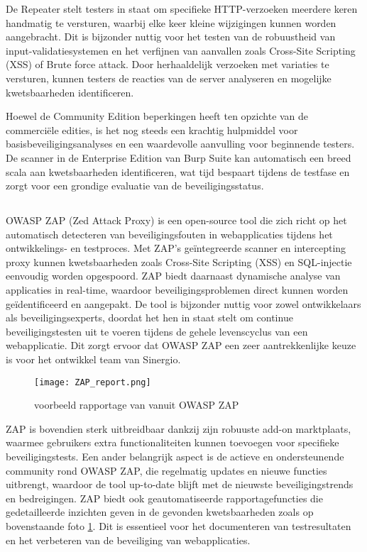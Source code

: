 De Repeater stelt testers in staat om specifieke HTTP-verzoeken meerdere keren handmatig te versturen, waarbij elke keer 
kleine wijzigingen kunnen worden aangebracht. Dit is bijzonder nuttig voor het testen van de robuustheid van 
input-validatiesystemen en het verfijnen van aanvallen zoals Cross-Site Scripting (XSS) of Brute force attack. Door 
herhaaldelijk verzoeken met variaties te versturen, kunnen testers de reacties van de server analyseren en mogelijke 
kwetsbaarheden identificeren.

Hoewel de Community Edition beperkingen heeft ten opzichte van de 
commerciële edities, is het nog steeds een krachtig hulpmiddel voor basisbeveiligingsanalyses en een waardevolle aanvulling 
voor beginnende testers. De scanner in de Enterprise Edition van Burp Suite kan automatisch een breed scala aan kwetsbaarheden 
identificeren, wat tijd bespaart tijdens de testfase en zorgt voor een grondige evaluatie van de beveiligingsstatus.

\subsection{}
OWASP ZAP (Zed Attack Proxy) is een open-source tool die zich richt op het automatisch detecteren van beveiligingsfouten in 
webapplicaties tijdens het ontwikkelings- en testproces. Met ZAP's geïntegreerde scanner en intercepting proxy kunnen 
kwetsbaarheden zoals Cross-Site Scripting (XSS) en SQL-injectie eenvoudig worden opgespoord. ZAP biedt 
daarnaast dynamische analyse van applicaties in real-time, waardoor beveiligingsproblemen direct kunnen worden geïdentificeerd 
en aangepakt. De tool is bijzonder nuttig voor zowel ontwikkelaars als beveiligingsexperts, doordat het hen in staat stelt 
om continue beveiligingstesten uit te voeren tijdens de gehele levenscyclus van een webapplicatie. Dit zorgt ervoor dat 
OWASP ZAP een zeer aantrekkenlijke keuze is voor het ontwikkel team van Sinergio.
\begin{figure}
    \centering
    \texttt{[image: ZAP\_report.png]}
    \caption[voorbeeld rapportage van vanuit OWASP ZAP]{voorbeeld rapportage van vanuit OWASP ZAP}
    \label{fig:zap_report}
\end{figure}
ZAP is bovendien sterk uitbreidbaar dankzij zijn robuuste add-on marktplaats, waarmee gebruikers extra functionaliteiten 
kunnen toevoegen voor specifieke beveiligingstests. Een ander belangrijk aspect is de actieve en ondersteunende community 
rond OWASP ZAP, die regelmatig updates en nieuwe functies uitbrengt, waardoor de tool up-to-date blijft met de nieuwste 
beveiligingstrends en bedreigingen. ZAP biedt ook geautomatiseerde rapportagefuncties die gedetailleerde inzichten geven 
in de gevonden kwetsbaarheden zoals op bovenstaande foto \ref{fig:zap_report}. Dit is essentieel voor het documenteren van testresultaten en het verbeteren van de beveiliging 
van webapplicaties. 

